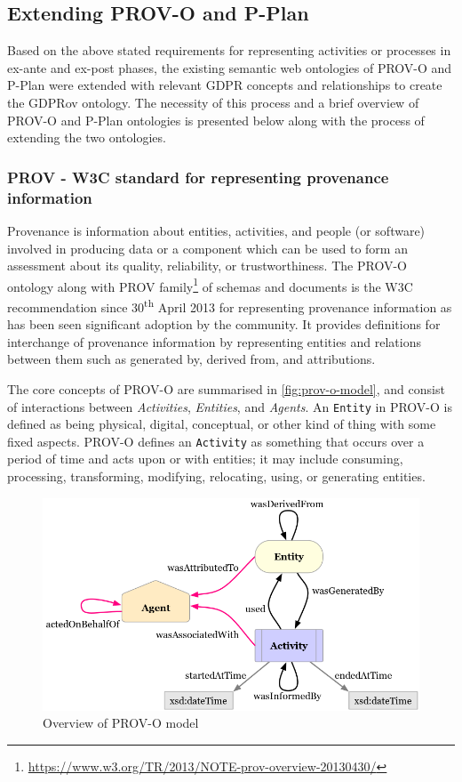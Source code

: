 \subsection{Extending PROV-O and P-Plan}
Based on the above stated requirements for representing activities or processes in ex-ante and ex-post phases, the existing semantic web ontologies of PROV-O \cite{lebo_prov-o:_2013} and P-Plan \cite{garijo_p-plan_2014} were extended with relevant GDPR concepts and relationships to create the GDPRov ontology. The necessity of this process and a brief overview of PROV-O and P-Plan ontologies is presented below along with the process of extending the two ontologies.

\subsubsection{PROV - W3C standard for representing provenance information}
Provenance is information about entities, activities, and people (or software)
involved in producing data or a component which can be used to form an
assessment about its quality, reliability, or trustworthiness. The PROV-O ontology \cite{lebo_prov-o:_2013} along with PROV family\footnote{\url{https://www.w3.org/TR/2013/NOTE-prov-overview-20130430/}} of schemas and documents is the W3C recommendation since 30\textsuperscript{th} April 2013 for representing provenance information as has been seen significant adoption by the community.
It provides definitions for interchange of provenance information by representing entities
and relations between them such as generated by, derived from, and attributions.

The core concepts of PROV-O are summarised in \autoref{fig:prov-o-model}, and consist of interactions between \textit{Activities}, \textit{Entities}, and \textit{Agents}.
An \texttt{Entity} in PROV-O is defined as being physical, digital, conceptual, or other
kind of thing with some fixed aspects. PROV-O defines an \texttt{Activity} as something
that occurs over a period of time and acts upon or with entities; it may include
consuming, processing, transforming, modifying, relocating, using, or generating
entities.
\begin{figure}[htbp]
    \centering
    \includegraphics[width=0.8\linewidth]{img/prov-o-model.png}
    \caption{Overview of PROV-O model \cite{lebo_prov-o:_2013}}
    \label{fig:prov-o-model}
\end{figure}

